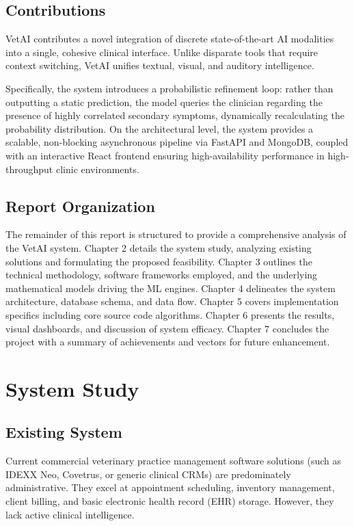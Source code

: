 \documentclass[a4paper,12pt]{report}
\begin{document}
\section{Contributions}

VetAI contributes a novel integration of discrete state-of-the-art AI modalities into a single, cohesive clinical interface. Unlike disparate tools that require context switching, VetAI unifies textual, visual, and auditory intelligence. 

Specifically, the system introduces a probabilistic refinement loop: rather than outputting a static prediction, the model queries the clinician regarding the presence of highly correlated secondary symptoms, dynamically recalculating the probability distribution. On the architectural level, the system provides a scalable, non-blocking asynchronous pipeline via FastAPI and MongoDB, coupled with an interactive React frontend ensuring high-availability performance in high-throughput clinic environments.

\section{Report Organization}

The remainder of this report is structured to provide a comprehensive analysis of the VetAI system. Chapter 2 details the system study, analyzing existing solutions and formulating the proposed feasibility. Chapter 3 outlines the technical methodology, software frameworks employed, and the underlying mathematical models driving the ML engines. Chapter 4 delineates the system architecture, database schema, and data flow. Chapter 5 covers implementation specifics including core source code algorithms. Chapter 6 presents the results, visual dashboards, and discussion of system efficacy. Chapter 7 concludes the project with a summary of achievements and vectors for future enhancement.

\chapter{System Study}

\section{Existing System}

Current commercial veterinary practice management software solutions (such as IDEXX Neo, Covetrus, or generic clinical CRMs) are predominately administrative. They excel at appointment scheduling, inventory management, client billing, and basic electronic health record (EHR) storage. However, they lack active clinical intelligence.
\end{document}
